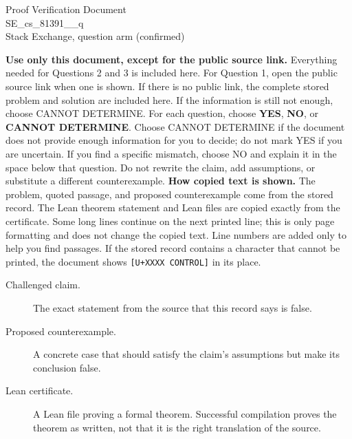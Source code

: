 \documentclass[11pt]{article}
\begin{document}
\begin{center}{\LARGE Proof Verification Document}\\[2pt]{\large SE\_cs\_81391\_\_q}\\[2pt]{\small Stack Exchange, question arm (confirmed)}\end{center}
\begin{center}\end{center}
\textbf{Use only this document, except for the public source link.} Everything needed for Questions 2 and 3 is included here. For Question 1, open the public source link when one is shown. If there is no public link, the complete stored problem and solution are included here. If the information is still not enough, choose CANNOT DETERMINE.
For each question, choose \textbf{YES}, \textbf{NO}, or \textbf{CANNOT DETERMINE}. Choose CANNOT DETERMINE if the document does not provide enough information for you to decide; do not mark YES if you are uncertain. If you find a specific mismatch, choose NO and explain it in the space below that question. Do not rewrite the claim, add assumptions, or substitute a different counterexample.
\textbf{How copied text is shown.} The problem, quoted passage, and proposed counterexample come from the stored record. The Lean theorem statement and Lean files are copied exactly from the certificate. Some long lines continue on the next printed line; this is only page formatting and does not change the copied text. Line numbers are added only to help you find passages. If the stored record contains a character that cannot be printed, the document shows \texttt{[U+XXXX CONTROL]} in its place.
\begin{description}
\item[Challenged claim.] The exact statement from the source that this record says is false.
\item[Proposed counterexample.] A concrete case that should satisfy the claim's assumptions but make its conclusion false.
\item[Lean certificate.] A Lean file proving a formal theorem. Successful compilation proves the theorem as written, not that it is the right translation of the source.
\end{description}
\end{document}
